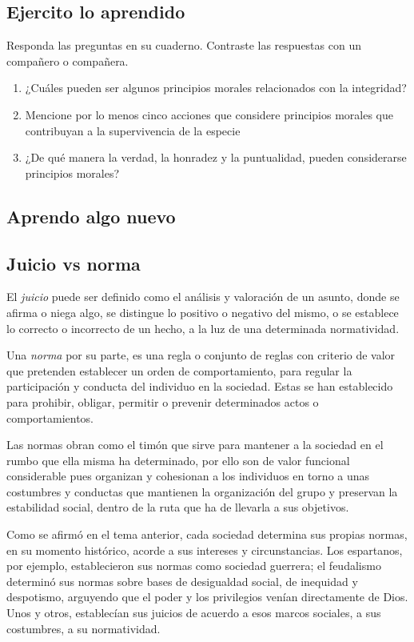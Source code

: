 \documentclass[10pt,twoside]{article}
\begin{document}
\subsection{Ejercito lo aprendido}
Responda las preguntas en su cuaderno. Contraste las respuestas con un compañero o compañera.
\begin{enumerate}
\item ¿Cuáles pueden ser algunos principios morales relacionados con la integridad?
\item Mencione por lo menos cinco acciones que considere principios morales que contribuyan a la supervivencia de la especie
\item ¿De qué manera la verdad, la honradez y la puntualidad, pueden considerarse principios morales?
\end{enumerate}
\subsection{Aprendo algo nuevo}
\subsection*{Juicio vs norma}
El \emph{juicio} puede ser definido como el análisis y valoración de un asunto, donde se afirma o niega algo, se distingue lo positivo o negativo del mismo, o se establece lo correcto o incorrecto de un hecho, a la luz de una determinada
normatividad.

Una \emph{norma} por su parte, es una regla o conjunto de reglas con criterio de valor que pretenden establecer un orden de comportamiento, para regular la participación y conducta del individuo en la sociedad. Estas se han establecido para prohibir, obligar, permitir o prevenir determinados actos o comportamientos.

Las normas obran como el timón que sirve para mantener a la sociedad en el rumbo que ella misma ha determinado, por ello son de valor funcional considerable pues organizan y cohesionan a los individuos en torno a unas costumbres y conductas que mantienen la organización del grupo y preservan la estabilidad social, dentro de la ruta que ha de llevarla a sus objetivos.

Como se afirmó en el tema anterior, cada sociedad determina sus propias normas, en su momento histórico, acorde a sus intereses y circunstancias. Los espartanos, por ejemplo, establecieron sus normas como sociedad guerrera; el feudalismo determinó sus normas sobre bases de desigualdad social, de inequidad y despotismo, arguyendo que el poder y los privilegios venían directamente de Dios. Unos y otros, establecían sus juicios de acuerdo a esos marcos sociales, a sus costumbres, a su normatividad.
\end{document}
